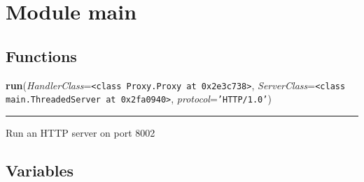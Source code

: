 %
%
%


\section{Module main}

    \label{main}


  \subsection{Functions}

    \label{main:run}

    \vspace{0.5ex}

\hspace{.8\funcindent}\begin{boxedminipage}{\funcwidth}

    \raggedright \textbf{run}(\textit{HandlerClass}={\tt {\textless}class Proxy.Proxy at 0x2e3c738{\textgreater}}, \textit{ServerClass}={\tt {\textless}class main.ThreadedServer at 0x2fa0940{\textgreater}}, \textit{protocol}={\tt \texttt{'}\texttt{HTTP/1.0}\texttt{'}})

    \vspace{-1.5ex}

    \rule{\textwidth}{0.5\fboxrule}
\setlength{\parskip}{2ex}
    Run an HTTP server on port 8002

\setlength{\parskip}{1ex}
    \end{boxedminipage}



  \subsection{Variables}

